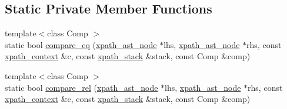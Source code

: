 \subsection*{Static Private Member Functions}
\begin{DoxyCompactItemize}
\item 
{\footnotesize template$<$class Comp $>$ }\\static bool \hyperlink{classxpath__ast__node_a16805022b8f8b8f26061b11d0f8e01b5}{compare\_\-eq} (\hyperlink{classxpath__ast__node}{xpath\_\-ast\_\-node} $\ast$lhs, \hyperlink{classxpath__ast__node}{xpath\_\-ast\_\-node} $\ast$rhs, const \hyperlink{structxpath__context}{xpath\_\-context} \&c, const \hyperlink{structxpath__stack}{xpath\_\-stack} \&stack, const Comp \&comp)
\item 
{\footnotesize template$<$class Comp $>$ }\\static bool \hyperlink{classxpath__ast__node_a055805c7365ac7d99174d2bf7a0cd5e2}{compare\_\-rel} (\hyperlink{classxpath__ast__node}{xpath\_\-ast\_\-node} $\ast$lhs, \hyperlink{classxpath__ast__node}{xpath\_\-ast\_\-node} $\ast$rhs, const \hyperlink{structxpath__context}{xpath\_\-context} \&c, const \hyperlink{structxpath__stack}{xpath\_\-stack} \&stack, const Comp \&comp)
\end{DoxyCompactItemize}
